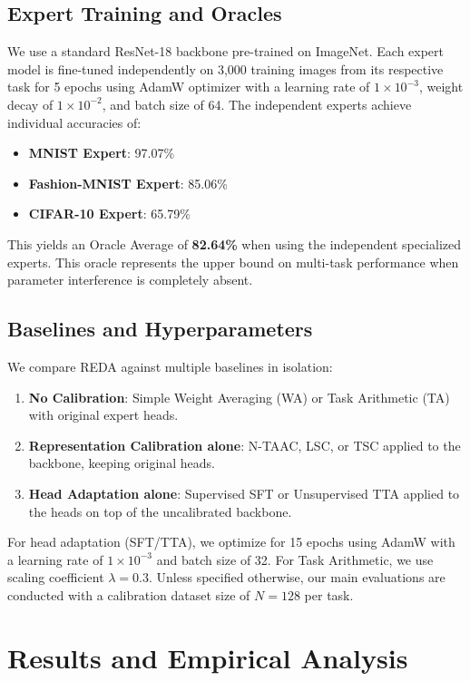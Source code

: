 \documentclass{article}
\theoremstyle{plain}
\theoremstyle{definition}
\theoremstyle{remark}
\begin{document}
\subsection{Expert Training and Oracles}
We use a standard ResNet-18 backbone pre-trained on ImageNet. Each expert model is fine-tuned independently on 3,000 training images from its respective task for 5 epochs using AdamW optimizer \cite{loshchilov2017decoupled} with a learning rate of $1\times10^{-3}$, weight decay of $1\times10^{-2}$, and batch size of 64.
The independent experts achieve individual accuracies of:
\begin{itemize}
    \item \textbf{MNIST Expert}: 97.07\%
    \item \textbf{Fashion-MNIST Expert}: 85.06\%
    \item \textbf{CIFAR-10 Expert}: 65.79\%
\end{itemize}
This yields an Oracle Average of \textbf{82.64\%} when using the independent specialized experts. This oracle represents the upper bound on multi-task performance when parameter interference is completely absent.

\subsection{Baselines and Hyperparameters}
We compare REDA against multiple baselines in isolation:
\begin{enumerate}
    \item \textbf{No Calibration}: Simple Weight Averaging (WA) or Task Arithmetic (TA) with original expert heads.
    \item \textbf{Representation Calibration alone}: N-TAAC, LSC, or TSC applied to the backbone, keeping original heads.
    \item \textbf{Head Adaptation alone}: Supervised SFT or Unsupervised TTA applied to the heads on top of the uncalibrated backbone.
\end{enumerate}
For head adaptation (SFT/TTA), we optimize for 15 epochs using AdamW with a learning rate of $1\times10^{-3}$ and batch size of 32. For Task Arithmetic, we use scaling coefficient $\lambda = 0.3$. Unless specified otherwise, our main evaluations are conducted with a calibration dataset size of $N=128$ per task.

\section{Results and Empirical Analysis}
\label{sec:results}
\end{document}
